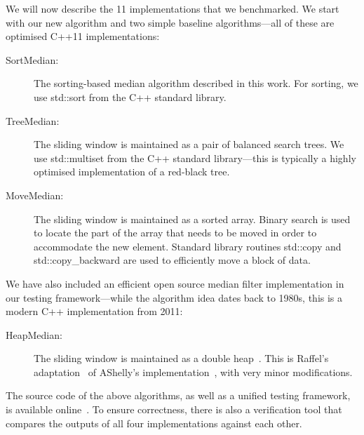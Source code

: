 \documentclass[a4paper,11pt]{article}
\begin{document}
We will now describe the 11 implementations that we benchmarked. We start with our new algorithm and two simple baseline algorithms---all of these are optimised C++11 implementations:
\begin{description}
    \item[SortMedian:] The sorting-based median algorithm described in this work. For sorting, we use std::sort from the C++ standard library.
    \item[TreeMedian:] The sliding window is maintained as a pair of balanced search trees. We use std::multiset from the C++ standard library---this is typically a highly optimised implementation of a red-black tree.
    \item[MoveMedian:] The sliding window is maintained as a sorted array. Binary search is used to locate the part of the array that needs to be moved in order to accommodate the new element. Standard library routines std::copy and std::copy\_backward are used to efficiently move a block of data.
\end{description}
We have also included an efficient open source median filter implementation in our testing framework---while the algorithm idea dates back to 1980s, this is a modern C++ implementation from 2011:
\begin{description}
    \item[HeapMedian:] The sliding window is maintained as a double heap~\cite{astola89median,juhola91comparison,hardle95median-smooth}. This is Raffel's adaptation~ of AShelly's implementation~, with very minor modifications.
\end{description}
The source code of the above algorithms, as well as a unified testing framework, is available online~. To ensure correctness, there is also a verification tool that compares the outputs of all four implementations against each other.
\end{document}
